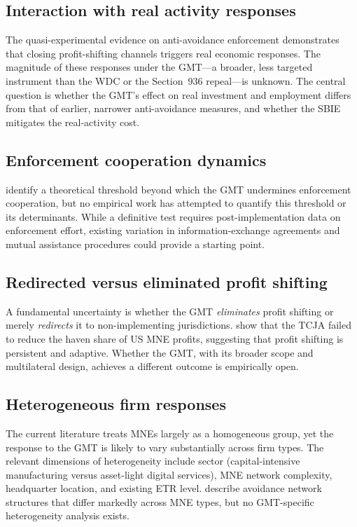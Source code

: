 \documentclass[12pt,a4paper]{article}
\begin{document}
\subsection{Interaction with real activity responses}

The quasi-experimental evidence on anti-avoidance enforcement \parencite{bilicka2022,suarezserrato2019} demonstrates that closing profit-shifting channels triggers real economic responses.
The magnitude of these responses under the GMT---a broader, less targeted instrument than the WDC or the Section~936 repeal---is unknown.
The central question is whether the GMT's effect on real investment and employment differs from that of earlier, narrower anti-avoidance measures, and whether the SBIE mitigates the real-activity cost.

\subsection{Enforcement cooperation dynamics}

\textcite{hindriks2025} identify a theoretical threshold beyond which the GMT undermines enforcement cooperation, but no empirical work has attempted to quantify this threshold or its determinants.
While a definitive test requires post-implementation data on enforcement effort, existing variation in information-exchange agreements and mutual assistance procedures could provide a starting point.

\subsection{Redirected versus eliminated profit shifting}

A fundamental uncertainty is whether the GMT \emph{eliminates} profit shifting or merely \emph{redirects} it to non-implementing jurisdictions.
\textcite{garcia2022} show that the TCJA failed to reduce the haven share of US MNE profits, suggesting that profit shifting is persistent and adaptive.
Whether the GMT, with its broader scope and multilateral design, achieves a different outcome is empirically open.

\subsection{Heterogeneous firm responses}

The current literature treats MNEs largely as a homogeneous group, yet the response to the GMT is likely to vary substantially across firm types.
The relevant dimensions of heterogeneity include sector (capital-intensive manufacturing versus asset-light digital services), MNE network complexity, headquarter location, and existing ETR level.
\textcite{bilicka2023} describe avoidance network structures that differ markedly across MNE types, but no GMT-specific heterogeneity analysis exists.
\end{document}
